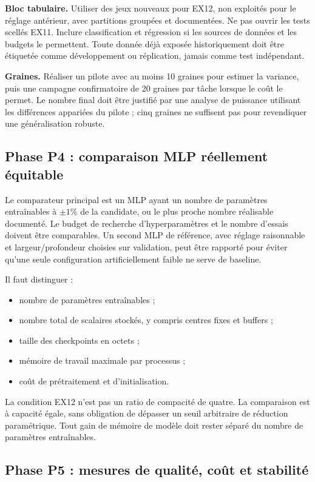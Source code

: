 \documentclass[11pt,a4paper]{article}
\begin{document}
\textbf{Bloc tabulaire.} Utiliser des jeux nouveaux pour EX12, non exploités pour le réglage antérieur, avec partitions groupées et documentées. Ne pas ouvrir les tests scellés EX11. Inclure classification et régression si les sources de données et les budgets le permettent. Toute donnée déjà exposée historiquement doit être étiquetée comme développement ou réplication, jamais comme test indépendant.

\textbf{Graines.} Réaliser un pilote avec au moins 10 graines pour estimer la variance, puis une campagne confirmatoire de 20 graines par tâche lorsque le coût le permet. Le nombre final doit être justifié par une analyse de puissance utilisant les différences appariées du pilote ; cinq graines ne suffisent pas pour revendiquer une généralisation robuste.

\subsection{Phase P4 : comparaison MLP réellement équitable}

Le comparateur principal est un MLP ayant un nombre de paramètres entraînables à $\pm 1\%$ de la candidate, ou le plus proche nombre réalisable documenté. Le budget de recherche d'hyperparamètres et le nombre d'essais doivent être comparables. Un second MLP de référence, avec réglage raisonnable et largeur/profondeur choisies sur validation, peut être rapporté pour éviter qu'une seule configuration artificiellement faible ne serve de baseline.

Il faut distinguer :
\begin{itemize}
  \item nombre de paramètres entraînables ;
  \item nombre total de scalaires stockés, y compris centres fixes et buffers ;
  \item taille des checkpoints en octets ;
  \item mémoire de travail maximale par processus ;
  \item coût de prétraitement et d'initialisation.
\end{itemize}

La condition EX12 n'est pas un ratio de compacité de quatre. La comparaison est à capacité égale, sans obligation de dépasser un seuil arbitraire de réduction paramétrique. Tout gain de mémoire de modèle doit rester séparé du nombre de paramètres entraînables.

\subsection{Phase P5 : mesures de qualité, coût et stabilité}
\end{document}
